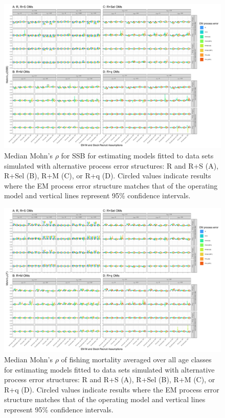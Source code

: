 \documentclass[
  12pt,
]{article}
\begin{document}
\begin{landscape}
\begin{figure}
\begin{center}
\includegraphics[width = 1.4\textwidth]{mohns_rho_ssb_plots}
\end{center}
\caption{Median Mohn's $\rho$ for SSB for estimating models fitted to data sets simulated with alternative process error structures: R and R+S (A), R+Sel (B), R+M (C), or R+q (D). Circled values indicate results where the EM process error structure matches that of the operating model and vertical lines represent 95\% confidence intervals.}\label{mohns_rho_ssb}
\end{figure}
\end{landscape}

\begin{landscape}
\begin{figure}
\begin{center}
\includegraphics[width = 1.4\textwidth]{mohns_rho_F_plots}
\end{center}
\caption{Median Mohn's $\rho$ of fishing mortality averaged over all age classes for estimating models fitted to data sets simulated with alternative process error structures: R and R+S (A), R+Sel (B), R+M (C), or R+q (D). Circled values indicate results where the EM process error structure matches that of the operating model and vertical lines represent 95\% confidence intervals.}\label{mohns_rho_F}
\end{figure}
\end{landscape}
\end{document}
